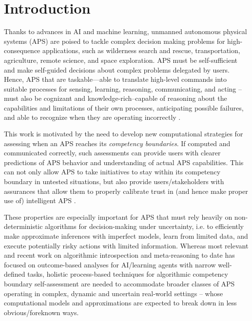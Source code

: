 \section{Introduction}

Thanks to advances in AI and machine learning, unmanned autonomous physical systems (APS) are poised to tackle complex decision making problems for high-consequence applications, such as wilderness search and rescue, transportation, agriculture, remote science, and space exploration. 
APS must be self-sufficient and make self-guided decisions about complex problems delegated by users. Hence, APS that are taskable---able to translate high-level commands into suitable processes for sensing, learning, reasoning, communicating, and acting --must also be cognizant and knowledge-rich--capable of reasoning about the capabilities and limitations of their own processes, anticipating possible failures, and able to recognize when they are operating incorrectly \cite{david2016defense}. %

This work is motivated by the need to develop new computational strategies for assessing when an APS reaches its \emph{competency boundaries}. If computed and communicated correctly, such assessments can provide users with clearer predictions of APS behavior and understanding of actual APS capabilities. This can not only allow APS to take initiatives to stay within its competency boundary in untested situations, but also provide users/stakeholders with assurances that allow them to properly calibrate trust in (and hence make proper use of) intelligent APS \cite{Israelsen2017-ym}. 

These properties are especially important for APS that must rely heavily on non-deterministic algorithms for decision-making under uncertainty, i.e. to efficiently make approximate inferences with imperfect models, learn from limited data, and execute potentially risky actions with limited information. 
Whereas most relevant and recent work on algorithmic introspection and meta-reasoning to date has focused on outcome-based analyses for  AI/learning agents with narrow well-defined tasks, holistic process-based techniques for algorithmic competency boundary self-assessment are needed to accommodate broader classes of APS operating in complex, dynamic and uncertain real-world settings -- whose computational models and approximations are expected to break down in less obvious/foreknown ways. %

